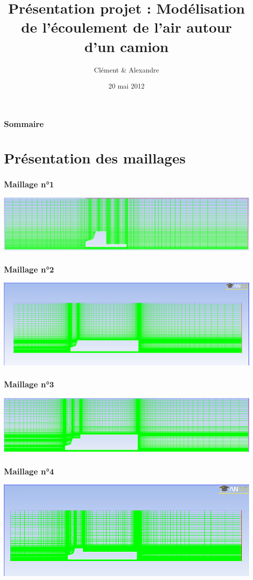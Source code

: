 \documentclass[handout]{beamer}
\title[MecaFlux]{Présentation projet : Modélisation de l'écoulement de l'air autour d'un camion}
\author{Clément \bsc{Rousseau} \& Alexandre \bsc{Vieira}}
\institute{INSA de Rouen}
\date{20 mai 2012}
\begin{document}
\begin{frame}
\titlepage
\end{frame}

\begin{frame}
	\frametitle{Sommaire}
	\tableofcontents
\end{frame}

\section[Maillages]{Présentation des maillages}
 
\begin{frame}
	\frametitle{Maillage n°1}
	\includegraphics[scale=0.38]{../images/camion_cabine_1.png}
\end{frame}

\begin{frame}
	\frametitle{Maillage n°2}
	\includegraphics[scale=0.3]{../images/remorque1_mesh.png}
\end{frame}

\begin{frame}
	\frametitle{Maillage n°3}
	\includegraphics[scale=0.35]{../images/camion_remorque_1.png}
\end{frame}

\begin{frame}
	\frametitle{Maillage n°4}
	\includegraphics[scale=0.38]{../images/remorque3_mesh.png}
\end{frame}
\end{document}
